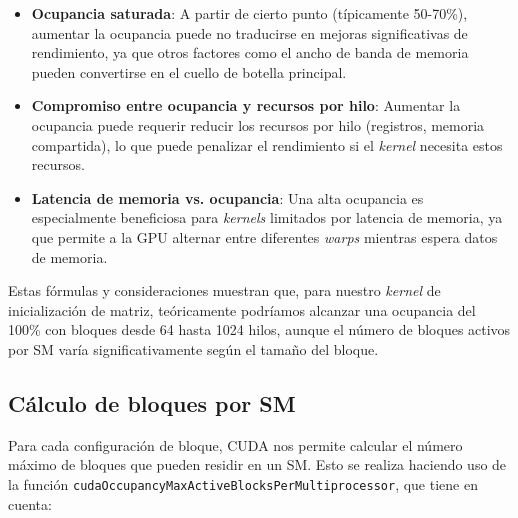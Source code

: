             \begin{itemize}
                
                \item \textbf{Ocupancia saturada}: A partir de cierto punto (típicamente 50-70\%), aumentar la ocupancia puede no traducirse en mejoras significativas de rendimiento, ya que otros factores como el ancho de banda de memoria pueden convertirse en el cuello de botella principal.
                
                \item \textbf{Compromiso entre ocupancia y recursos por hilo}: Aumentar la ocupancia puede requerir reducir los recursos por hilo (registros, memoria compartida), lo que puede penalizar el rendimiento si el \textit{kernel} necesita estos recursos.
        
                \item \textbf{Latencia de memoria vs. ocupancia}: Una alta ocupancia es especialmente beneficiosa para \textit{kernels} limitados por latencia de memoria, ya que permite a la GPU alternar entre diferentes \textit{warps} mientras espera datos de memoria.
            
            \end{itemize}
            
            Estas fórmulas y consideraciones muestran que, para nuestro \textit{kernel} de inicialización de matriz, teóricamente podríamos alcanzar una ocupancia del 100\% con bloques desde 64 hasta 1024 hilos, aunque el número de bloques activos por SM varía significativamente según el tamaño del bloque.
        
    \subsection{Cálculo de bloques por SM}
    
        Para cada configuración de bloque, CUDA nos permite calcular el número máximo de bloques que pueden residir en un SM. Esto se realiza haciendo uso de la función \texttt{cudaOccupancyMaxActiveBlocksPerMultiprocessor}, que tiene en cuenta:

